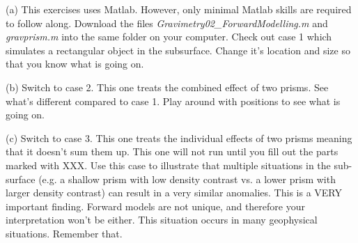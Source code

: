 \documentclass[a4paper,12pt]{article}
\begin{document}
  (a) This exercises uses Matlab. However, only minimal Matlab skills are required to follow along. Download the files \textit{Gravimetry02\_ForwardModelling.m} and \textit{gravprism.m} into the same folder on your computer. Check out case 1 which simulates a rectangular object in the subsurface. Change it's location and size so that you know what is going on.

  (b) Switch to case 2. This one treats the combined effect of two prisms. See what's different compared to case 1. Play around with positions to see what is going on.

  (c) Switch to case 3. This one treats the individual effects of two prisms meaning that it doesn't sum them up. This one will not run until you fill out the parts marked with XXX. Use this case to illustrate that multiple situations in the sub-surface (e.g. a shallow prism with low density contrast vs. a lower prism with larger density contrast) can result in a very similar anomalies. This is a VERY important finding. Forward models are not unique, and therefore your interpretation won't be either. This situation occurs in many geophysical situations. Remember that.
\end{document}
